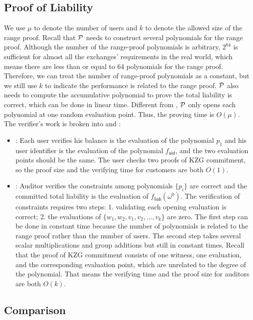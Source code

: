 \subsection{Proof of Liability}
We use $\mu$ to denote the number of users and $k$ to denote the allowed size of the range proof. Recall that $\mathcal{P}$ needs to construct several polynomials for the range proof. Although the number of the range-proof polynomials is arbitrary, $2^{64}$ is sufficient for almost all the exchanges' requirements in the real world, which means there are less than or equal to 64 polynomials for the range proof. Therefore, we can treat the number of range-proof polynomials as a constant, but we still use $k$ to indicate the performance is related to the range proof. $\mathcal{P}$ also needs to compute the accumulative polynomial to prove the total liability is correct, which can be done in linear time. Different from \bootstrap, $\mathcal{P}$ only opens each polynomial at one random evaluation point. Thus, the proving time is $O(\mu)$.
The verifier's work is broken into \userproof and \pol:
\begin{itemize}
\item \userproof: Each user verifies his balance is the evaluation of the polynomial $p_1$ and his user identifier is the evaluation of the polynomial $f_\mathsf{uid}$, and the two evaluation points should be the same. The user checks two proofs of KZG commitment, so the proof size and the verifying time for customers are both $O(1)$.
\item \pol: Auditor verifies the constraints among polynomials $\{p_i\}$ are correct and the committed total liability is the evaluation of $f_\mathsf{liab}(\omega^0)$. The verification of constraints requires two steps: 1. validating each opening evaluation is correct; 2. the evaluations of $\{w_1,w_2,v_1,v_2,\dots,v_k\}$ are zero. The first step can be done in constant time because the number of polynomials is related to the range proof rather than the number of users. The second step takes several scalar multiplications and group additions but still in constant times. Recall that the proof of KZG commitment consists of one witness, one evaluation, and the corresponding evaluation point, which are unrelated to the degree of the polynomial. That means the verifying time and the proof size for auditors are both $O(k)$.
\end{itemize}

\subsection{Comparison}

